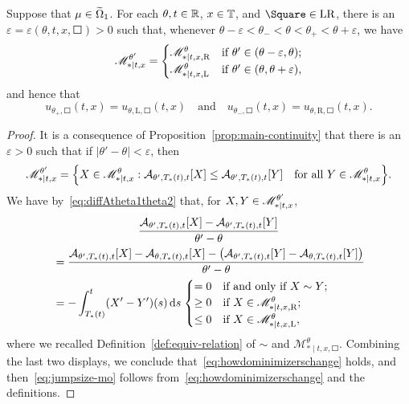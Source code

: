 \documentclass[AHL,Unicode,longabstracts]{cedram}
\newcounter{setofcase}
\newcounter{case}[setofcase]
\newcommand*\scM{\mathscr{M}}
\newcommand*\TT{\mathbb{T}}
\newcommand*\RR{\mathbb{R}}
\newcommand{\clA}{\mathcal{A}}
\newcommand*\st{\mathrel{:}}
\newcommand*\dif{\mathrm{d}}
\newcommand*\Left{\mathrm{L}}
\newcommand*\Right{\mathrm{R}}
\newcommand*\LR{\mathrm{LR}}
\newcommand*\eps{\varepsilon}
\let\oldin\in
\renewcommand{\in}{\mathchoice{\oldin}{\oldin}{\,\oldin\,}{\,\oldin\,}}
\let\originalleft\left
\let\originalright\right
\renewcommand{\left}{\mathopen{}\mathclose\bgroup\originalleft}
\renewcommand{\right}{\aftergroup\egroup\originalright}
\newcommand*\TT{\mathbb{T}}
\newcommand*\RR{\mathbb{R}}
\begin{document}
\begin{prop}\label{prop:locallyconstant}
Suppose that $\mu\in\widetilde{\Omega}_{1}$. For each $\theta,t\in\RR$, $x\in\TT$, and $\Square\in\LR$, there is an $\eps=\eps(\theta,t,x,\Square)>0$ such that, whenever $\theta-\eps<\theta_{-}<\theta<\theta_{+}<\theta+\eps$, we have
\begin{equation}\label{eq:howdominimizerschange}
\scM_{*\mid t,x}^{\theta'}=
\begin{cases}
\scM_{*\mid t,x,\Right}^{\theta} & \text{if }\theta'\in(\theta-\eps,\theta);\\
\scM_{*\mid t,x,\Left}^{\theta} & \text{if }\theta'\in(\theta,\theta+\eps),
\end{cases}
\end{equation}
and hence that
\begin{equation}\label{eq:jumpsize-mo}
u_{\theta_{+},\Square}(t,x)=u_{\theta,\Left,\Square}(t,x)\quad\text{and}\quad u_{\theta_{-},\Square}(t,x)=u_{\theta,\Right,\Square}(t,x).
\end{equation}
\end{prop}

\begin{proof}
It is a consequence of Proposition~\ref{prop:main-continuity} that there is an $\eps>0$ such that if $|\theta'-\theta|<\eps$, then
\[
\scM_{*\mid t,x}^{\theta'}=\left\{ X\in\scM_{*\mid t,x}^{\theta}\st\clA_{\theta',T_{*}(t),t}[X]\le\clA_{\theta',T_{*}(t),t}[Y]\quad\text{for all }Y\in\scM_{*\mid t,x}^{\theta}\right\}.
\]
We have by~\eqref{eq:diffAtheta1theta2} that, for $X,Y\in\scM_{*\mid t,x}^{\theta'}$,
\begin{multline*}
\frac{\clA_{\theta',T_{*}(t),t}[X]-\clA_{\theta',T_{*}(t),t}[Y]}{\theta'-\theta}\\
\begin{aligned}
& =\frac{\clA_{\theta',T_{*}(t),t}[X]-\clA_{\theta,T_{*}(t),t}[X]-\left(\clA_{\theta',T_{*}(t),t}[Y]-\clA_{\theta,T_{*}(t),t}[Y]\right)}{\theta'-\theta}\\
& =-\int_{T_{*}(t)}^{t}(X'-Y')(s)\,\dif s\mathrel{
\begin{cases}
=0 & \text{if and only if }X\sim Y;\\
\ge0 & \text{if }X\in\scM_{*\mid t,x,\Right}^{\theta};\\
\le0 & \text{if }X\in\scM_{*\mid t,x,\Left}^{\theta},
\end{cases}}
\end{aligned}
\end{multline*}
where we recalled Definition~\ref{def:equiv-relation} of $\sim$ and $\scM_{*\mid t,x,\Square}^{\theta}$. Combining the last two displays, we conclude that~\eqref{eq:howdominimizerschange} holds, and then~\eqref{eq:jumpsize-mo} follows from~\eqref{eq:howdominimizerschange} and the definitions.
\end{proof}
\end{document}
